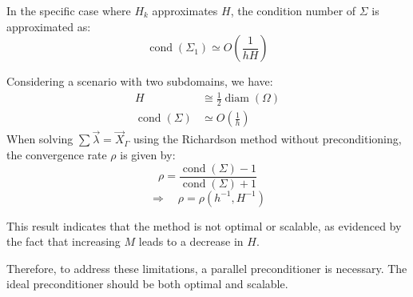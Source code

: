 \documentclass[11pt]{book}
\begin{document}
In the specific case where \( H_{k} \) approximates \( H \), the condition number of \( \Sigma \) is approximated as:
\begin{equation*}
    \operatorname{cond}(\Sigma_{1}) \simeq O\left(\frac{1}{h H}\right)
\end{equation*}

Considering a scenario with two subdomains, we have:
\begin{align*}
    H & \cong \frac{1}{2} \operatorname{diam}(\Omega) \\
    \operatorname{cond}(\Sigma) & \simeq O\left(\frac{1}{h}\right)
\end{align*}
When solving \( \sum \vec{\lambda} = \vec{X}_{\Gamma}  \) using the Richardson method without preconditioning, the convergence rate \( \rho \) is given by:
\begin{equation*}
    \rho = \frac{\operatorname{cond}(\Sigma) - 1}{\operatorname{cond}(\Sigma) + 1}
\end{equation*}
\begin{equation*}
    \Rightarrow \quad \rho = \rho\left(h^{-1}, H^{-1}\right)
\end{equation*}

This result indicates that the method is not optimal or scalable, as evidenced by the fact that increasing \( M \) leads to a decrease in \( H \).

Therefore, to address these limitations, a parallel preconditioner is necessary. The ideal preconditioner should be both optimal and scalable.


\end{document}
